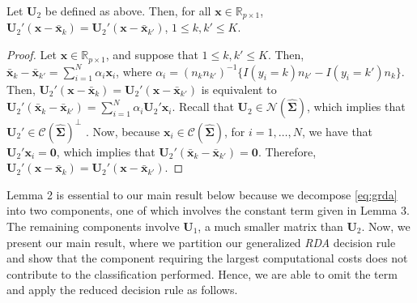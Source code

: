 \documentclass[11pt]{article}
\newcommand{\xbar}{\bar{\bm x}}
\begin{document}
\begin{lemma}\label{lemma:RDA-constant-term}
Let $\bm U_2$ be defined as above. Then, for all $\bm x \in \mathbb{R}_{p \times 1}$, $\bm U_2' (\bm x - \xbar_k) = \bm U_2' (\bm x - \xbar_{k'})$, $1 \le k, k' \le K$.
\end{lemma}
\begin{proof}
Let $\bm x \in \mathbb{R}_{p \times 1}$, and suppose that $1 \le k, k' \le K$. Then, $\xbar_k - \xbar_{k'} = \sum_{i=1}^N \alpha_i \bm x_i$, where $\alpha_i = (n_k n_{k'})^{-1} \{ I(y_i = k) n_{k'} - I(y_i = k') n_k \}$.  Then, $\bm U_2' (\bm x - \xbar_k) = \bm U_2' (\bm x - \xbar_{k'})$ is equivalent to $\bm U_2'(\xbar_k - \xbar_{k'}) = \sum_{i=1}^N \alpha_i \bm U_2' \bm x_i$. Recall that $\bm U_2 \in \mathcal{N}(\widehat{\bm \Sigma})$, which implies that $\bm U_2' \in \mathcal{C}(\widehat{\bm \Sigma})^{\perp}$ \citep[Lemma 1.2.5]{Kollo:2005vp}. Now, because $\bm x_i \in \mathcal{C}(\widehat{\bm \Sigma})$, for $i = 1, \ldots, N$, we have that $\bm U_2' \bm x_i = \bm 0$, which implies that $\bm U_2'(\xbar_k - \xbar_{k'}) = \bm 0$. Therefore, $\bm U_2' (\bm x - \xbar_k) = \bm U_2' (\bm x - \xbar_{k'})$.
\end{proof}

Lemma 2 is essential to our main result below because we decompose \eqref{eq:grda} into two components, one of which involves the constant term given in Lemma 3. The remaining components involve $\bm U_1$, a much smaller matrix than $\bm U_2$. Now, we present our main result, where we partition our generalized \emph{RDA} decision rule and show that the component requiring the largest computational costs does not contribute to the classification performed. Hence, we are able to omit the term and apply the reduced decision rule as follows.
\end{document}
